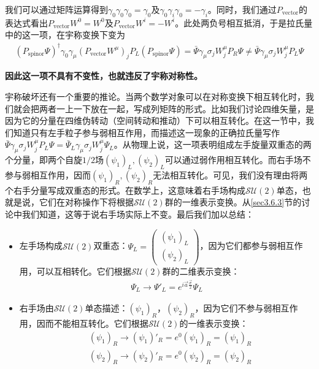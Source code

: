 我们可以通过矩阵运算得到$\gamma_0\gamma_0\gamma_0=\gamma_0$及$\gamma_0\gamma_i\gamma_0=-\gamma_i$。同时，我们通过$P_\text{vector}$的表达式看出$P_\text{vector}W^0 = W^0$及$P_\text{vector}W^i = -W^i$。此处两负号相互抵消，于是拉氏量中的这一项，在宇称变换下变为
\begin{align}
(P_\text{spinor}\Psi)^\dag\gamma_0\gamma_\mu(P_\text{vector}W^\mu)_jP_L(P_\text{spinor}\Psi)=\bar{\Psi}\gamma_\mu\sigma_j W_j^\mu P_R\Psi\ne\bar{\Psi}\gamma_\mu\sigma_j W_j^\mu P_L\Psi
\label{equ7.110}
\end{align}

\textbf{因此这一项不具有不变性，也就违反了宇称对称性。}

宇称破坏还有一个重要的推论。当两个数学对象可以在对称变换下相互转化时，我们就会把两者一上一下放在一起，写成列矩阵的形式。比如我们讨论四维矢量，是因为它的分量在四维伪转动（空间转动和推动）下可以相互转化。在这一节中，我们知道只有左手粒子参与弱相互作用，而描述这一现象的正确拉氏量写作$\bar{\Psi}\gamma_\mu\sigma_j W_j^\mu P_L\Psi=\bar{\Psi}_L\gamma_\mu\sigma_j W_j^\mu\Psi_L$。从物理上说，这一项表明组成左手旋量双重态的两个分量，即两个自旋$1/2$场$(\psi_1)_L,(\psi_2)_L$可以通过弱作用相互转化。而右手场不参与弱相互作用，因而$(\psi_1)_R,(\psi_2)_R$无法相互转化。可见，我们没有理由将两个右手分量写成双重态的形式。在数学上，这意味着右手场构成$\mathcal{SU}(2)$单态，也就是说，它们在对称操作下将根据$\mathcal{SU}(2)$群的一维表示变换。从\ref{sec3.6.3}节的讨论中我们知道，这等于说右手场实际上不变。最后我们加以总结：
\begin{itemize}
\item 左手场构成$\mathcal{SU}(2)$双重态：$\Psi_L=\begin{pmatrix}(\psi_1)_L\\ (\psi_2)_L\end{pmatrix}$，因为它们都参与弱相互作用，可以互相转化。它们根据$\mathcal{SU}(2)$群的二维表示变换：
\begin{align}
\Psi_L\rightarrow\Psi'_L=e^{i\vec{a}\frac{\vec{\sigma}}{2}}\Psi_L
\label{equ7.111}
\end{align}
\item 右手场由$\mathcal{SU}(2)$单态描述：$(\psi_1)_R$，$(\psi_2)_R$，因为它们不参与弱相互作用，因而不能相互转化。它们根据$\mathcal{SU}(2)$的一维表示变换：
\begin{align}
&(\psi_1)_R\rightarrow (\psi_1)'_R=e^0(\psi_1)_R=(\psi_1)_R\nonumber\\
&(\psi_2)_R\rightarrow (\psi_2)'_R=e^0(\psi_2)_R=(\psi_2)_R
\label{equ7.112}
\end{align}
\end{itemize}

